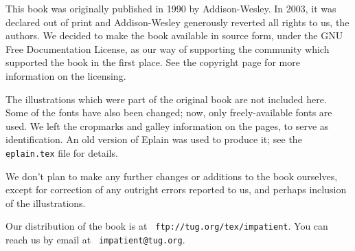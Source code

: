 
\baselineskip

 This book was originally
published in 1990 by Addison-Wesley.  In 2003, it was declared out of
print and Addison-Wesley generously reverted all rights to us, the
authors.  We decided to make the book available in source form, under
the GNU Free Documentation License, as our way of supporting the
community which supported the book in the first place.  See the
copyright page for more information on the licensing.

The illustrations which were part of the original book are not included
here.  Some of the fonts have also been changed; now, only
freely-available fonts are used.  We left the cropmarks and galley
information on the pages, to serve as identification.  An old version of
Eplain was used to produce it; see the {\tt eplain.tex} file for
details.

We don't plan to make any further changes or additions to the book
ourselves, except for correction of any outright errors reported to us,
and perhaps inclusion of the illustrations.

Our distribution of the book is at {\tt
ftp://tug.org/tex/impatient}.  You can reach us by email at {\tt
impatient@tug.org}.

\pagebreak
\byebye
